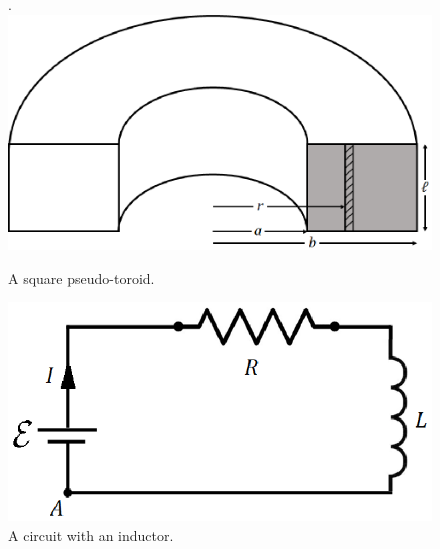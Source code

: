 \documentclass{scrartcl}
\begin{document}
    \begin{figure}[H]
        \centering
        \begin{minipage}[b]{0.55\textwidth}.
        \includegraphics[width=\textwidth]{tor.eps}
        \caption{A square pseudo-toroid.}
        \end{minipage}
        \hfill
        \begin{minipage}[b]{0.4\textwidth}
            \includegraphics[width=\textwidth]{inductor.eps}
            \caption{A circuit with an inductor.}
        \end{minipage}
    \end{figure}
\end{document}
